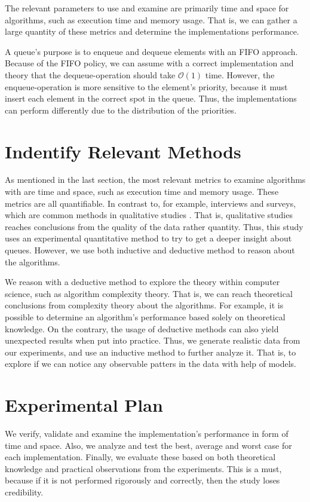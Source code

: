 \documentclass[a4paper,11pt]{kth-mag}
\newcommand*{\skippara}{\par\vspace{\baselineskip} \noindent}
\begin{document}
\skippara The relevant parameters to use and examine are primarily time and space for algorithms, such as execution time and memory usage.
That is, we can gather a large quantity of these metrics and determine the implementations performance.

\skippara A queue's purpose is to enqueue and dequeue elements with an FIFO approach.
Because of the FIFO policy, we can assume with a correct implementation and theory that the dequeue-operation should take $\mathcal{O}(1)$ time.
However, the enqueue-operation is more sensitive to the element's priority, because it must insert each element in the correct spot in the queue.
Thus, the implementations can perform differently due to the distribution of the priorities.

\section{Indentify Relevant Methods}\label{sec:methods}
As mentioned in the last section, the most relevant metrics to examine algorithms with are time and space, such as execution time and memory usage.
These metrics are all quantifiable.
In contrast to, for example, interviews and surveys, which are common methods in qualitative studies \cite{Omexperi69:online, haakansson2013portal}.
That is, qualitative studies reaches conclusions from the quality of the data rather quantity.
Thus, this study uses an experimental quantitative method to try to get a deeper insight about queues.
However, we use both inductive and deductive method to reason about the algorithms.

\skippara We reason with a deductive method to explore the theory within computer science, such as algorithm complexity theory.
That is, we can reach theoretical conclusions from complexity theory about the algorithms.
For example, it is possible to determine an algorithm's performance based solely on theoretical knowledge.
On the contrary, the usage of deductive methods can also yield unexpected results when put into practice.
Thus, we generate realistic data from our experiments, and use an inductive method to further analyze it.
That is, to explore if we can notice any observable patters in the data with help of models.

\section{Experimental Plan}\label{sec:plan}
We verify, validate and examine the implementation's performance in form of time and space.
Also, we analyze and test the best, average and worst case for each implementation.
Finally, we evaluate these based on both theoretical knowledge and practical observations from the experiments.
This is a must, because if it is not performed rigorously and correctly, then the study loses credibility.
\end{document}
